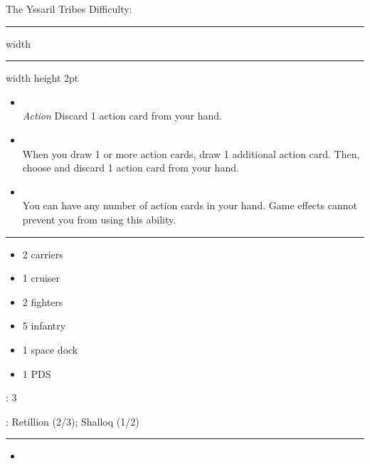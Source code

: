\newpage
{\handel\Huge The Yssaril Tribes} \hfill {\Large Difficulty: \medium} \vspace{-4pt}\\
\hrule width \hsize \kern 1mm \hrule width \hsize height 2pt


\begin{multicols}{2}


\begin{itemize}
\item {}\\
\emph{Action} Discard 1 action card from your hand.
\item {}\\
When you draw 1 or more action cards, draw 1 additional action card. Then, choose and discard 1 action card from your hand.
\item {}\\
You can have any number of action cards in your hand. Game effects cannot prevent you from using this ability.
\end{itemize}


\vspace{-10pt}\rule{\hsize}{0.4pt}\vspace{5pt}


\vspace{-5pt}
\begin{multicols}{2}
\begin{itemize}
\item 2 carriers
\item 1 cruiser
\item 2 fighters
\item 5 infantry
\item 1 space dock
\item 1 PDS
\end{itemize}
\end{multicols}

\vspace{-5pt}
: 3

\vspace{2pt}
: Retillion (2/3); Shalloq (1/2)

\rule{\hsize}{0.4pt}\vspace{5pt}


\begin{itemize}
\item \neural
\end{itemize}


\end{multicols}
